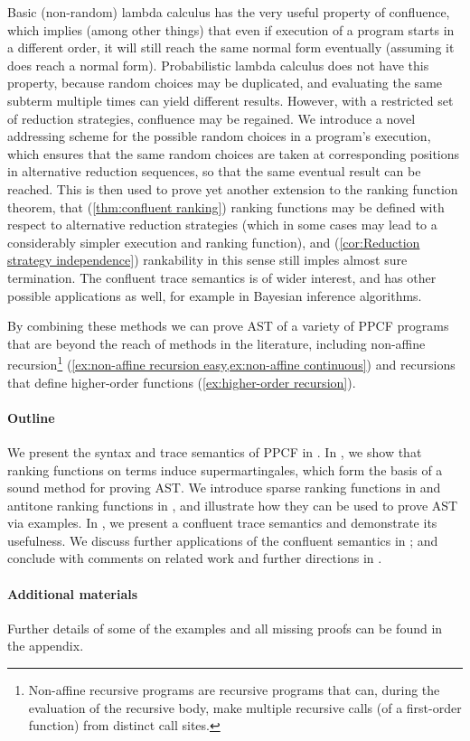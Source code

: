 Basic (non-random) lambda calculus has the very useful property of confluence, which implies (among other things) that even if execution of a program starts in a different order, it will still reach the same normal form eventually (assuming it does reach a normal form). 
Probabilistic lambda calculus does not have this property, because random choices may be duplicated, and evaluating the same subterm multiple times can yield different results. 
However, with a restricted set of reduction strategies, confluence may be regained. 
We introduce a novel addressing scheme for the possible random choices in a program's execution, which ensures that the same random choices are taken at corresponding positions in alternative reduction sequences, so that the same eventual result can be reached. 
This is then used to prove yet another extension to the ranking function theorem, that (\cref{thm:confluent ranking}) ranking functions may be defined with respect to alternative reduction strategies (which in some cases may lead to a considerably simpler execution and ranking function), and (\cref{cor:Reduction strategy independence}) rankability in this sense still imples almost sure termination. 
The confluent trace semantics is of wider interest, and has other possible applications as well, for example in Bayesian inference algorithms.

By combining these methods we can prove AST of a variety of PPCF programs that are beyond the reach of methods in the literature, including non-affine recursion\footnote{\label{fnote:non-affine} Non-affine recursive programs are recursive programs that can, during the evaluation of the recursive body, make multiple recursive calls (of a first-order function) from distinct call sites.} (\cref{ex:non-affine recursion easy,ex:non-affine continuous}) and recursions that define higher-order functions (\cref{ex:higher-order recursion}).

\paragraph*{Outline}

We present the syntax and trace semantics of PPCF in .
In , we show that ranking functions on terms induce supermartingales, which form the basis of a sound method for proving AST.
We introduce sparse ranking functions in  and antitone ranking functions in , and illustrate how they can be used to prove AST via examples. 
In , we present a confluent trace semantics and demonstrate its usefulness.
We discuss further applications of the confluent semantics in ; and conclude with comments on related work and further directions in .

\paragraph*{Additional materials} Further details of some of the examples and all missing proofs can be found in the appendix.
